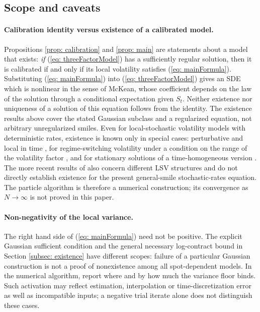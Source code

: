 \subsection{Scope and caveats}\label{subsec: caveats}

\paragraph{Calibration identity versus existence of a calibrated model.} Propositions \ref{prop: calibration} and \ref{prop: main} are statements about a model that exists: \emph{if} (\ref{eq: threeFactorModel}) has a sufficiently regular solution, then it is calibrated if and only if its local volatility satisfies (\ref{eq: mainFormula}). Substituting (\ref{eq: mainFormula}) into (\ref{eq: threeFactorModel}) gives an SDE which is nonlinear in the sense of McKean, whose coefficient depends on the law of the solution through a conditional expectation given $S_t$. Neither existence nor uniqueness of a solution of this equation follows from the identity. The existence results above cover the stated Gaussian subclass and a regularized equation, not arbitrary unregularized smiles. Even for local-stochastic volatility models with deterministic rates, existence is known only in special cases: perturbative and local in time \cite{abergelTachet}, for regime-switching volatility under a condition on the range of the volatility factor \cite{jourdainZhou}, and for stationary solutions of a time-homogeneous version \cite{lackerShkolnikovZhang}. The more recent results of \cite{djete,mustapha} also concern different LSV structures and do not directly establish existence for the present general-smile stochastic-rates equation. The particle algorithm is therefore a numerical construction; its convergence as $N\to\infty$ is not proved in this paper.

\paragraph{Non-negativity of the local variance.}
The right hand side of (\ref{eq: mainFormula}) need not be positive.
The explicit Gaussian sufficient condition and the general necessary
log-contract bound in Section \ref{subsec: existence} have different scopes:
failure of a particular Gaussian construction is not a proof of nonexistence
among all spot-dependent models. In the numerical algorithm, report where
and by how much the variance floor binds. Such activation may reflect
estimation, interpolation or time-discretization error as well as incompatible
inputs; a negative trial iterate alone does not distinguish these cases.

